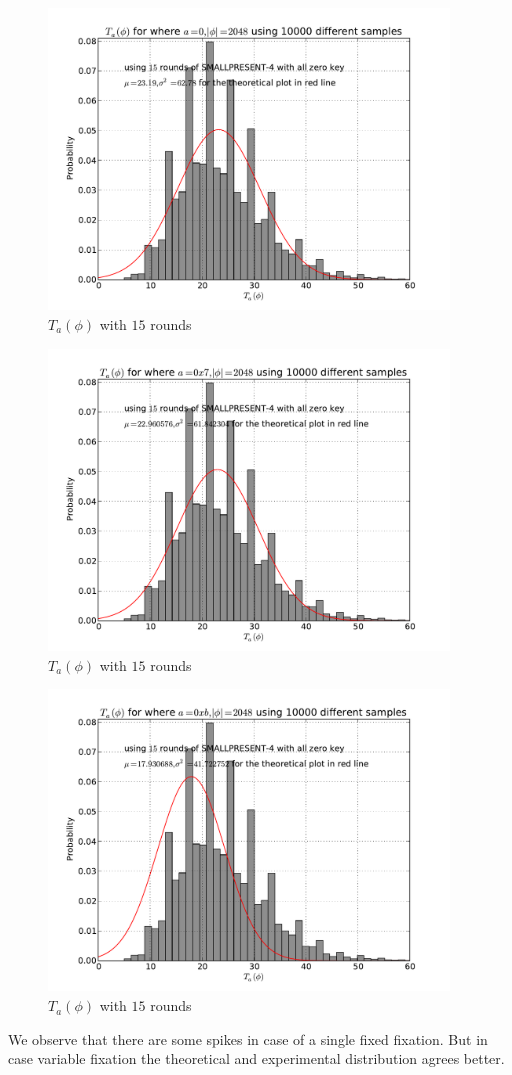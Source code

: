 \begin{figure}[h!] 
    \centering
    \includegraphics[width=\textwidth , height = 8cm]{images/T_fixed_a_with_value_0_and_variable_phi_size_2048_with_10000_samples}
    \caption{$T_a(\phi)$ with $15$ rounds}
    \label{fig:T_a_phi_with_15_rounds_0x00}
\end{figure}
\begin{figure}[h!]
    \centering
    \includegraphics[width=\textwidth , height = 8cm]{images/T_fixed_a_with_value_0x7_and_variable_phi_size_2048_with_10000_samples}
    \caption{$T_a(\phi)$ with $15$ rounds}
    \label{fig:T_a_phi_with_15_rounds_0x07}
\end{figure}
\begin{figure}[h!]
    \centering
    \includegraphics[width=\textwidth , height = 8cm]{images/T_fixed_a_with_value_0xb_and_variable_phi_size_2048_with_10000_samples}
    \caption{$T_a(\phi)$ with $15$ rounds}
    \label{fig:T_a_phi_with_15_rounds_0x0b}
\end{figure} \par \noindent
We observe that there are some spikes in case of a single fixed fixation. But in case variable fixation the theoretical and experimental distribution agrees better.
\fi